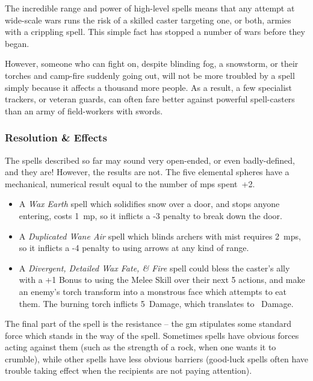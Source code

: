 \begin{multicols}{2}
\begin{exampletext}
  The incredible range and power of high-level spells means that any attempt at wide-scale wars runs the risk of a skilled caster targeting one, or both, armies with a crippling spell.
  This simple fact has stopped a number of wars before they began.

  However, someone who can fight on, despite blinding fog, a snowstorm, or their torches and camp-fire suddenly going out, will not be more troubled by a spell simply because it affects a thousand more people.
  As a result, a few specialist trackers, or veteran \glspl{guard}, can often fare better against powerful spell-casters than an army of field-workers with swords.
\end{exampletext}

\subsubsection{Resolution \& Effects}

The spells described so far may sound very open-ended, or even badly-defined, and they are!
However, the results are not.
The five elemental \glspl{sphere} have a mechanical, numerical result equal to the number of \glspl{mp} spent~+2.

\begin{itemize}
  \item
  A \textit{Wax Earth} spell which solidifies snow over a door, and stops anyone entering, costs 1~\gls{mp}, so it inflicts a -3 penalty to break down the door.
  \item
  A \textit{Duplicated Wane Air} spell which blinds archers with mist requires 2~\glspl{mp}, so it inflicts a -4 penalty to using arrows at any kind of range.
  \item
  A \textit{Divergent, Detailed Wax Fate, \& Fire} spell could bless the caster's ally with a +1 Bonus to using the Melee Skill over their next 5 actions, and make an enemy's torch transform into a monstrous face which attempts to eat them.
  The burning torch inflicts 5~Damage, which translates to ~Damage.%
\end{itemize}

The final part of the spell is the resistance -- the \gls{gm} stipulates some standard force which stands in the way of the spell.
Sometimes spells have obvious forces acting against them (such as the strength of a rock, when one wants it to crumble), while other spells have less obvious barriers (good-luck spells often have trouble taking effect when the recipients are not paying attention).


\end{multicols}
